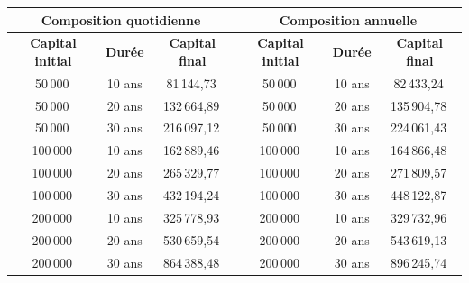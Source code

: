 \documentclass{article}
\begin{document}
\begin{enumerate}[label=\textbf{R2.\arabic*}]
                \begin{center}
                    \renewcommand{\arraystretch}{1.2}
                    \begin{tabular}{|c|c|c||c|c|c|}
                        \hline
                        \multicolumn{3}{|c||}{\textbf{Composition quotidienne}} & \multicolumn{3}{c|}{\textbf{Composition annuelle}} \\
                        \hline
                        \textbf{Capital initial} & \textbf{Durée} & \textbf{Capital final} & \textbf{Capital initial} & \textbf{Durée} & \textbf{Capital final} \\
                        \hline
                        50\,000\,\text{€} & 10 ans & 81\,144,73\,\text{€} & 
                        50\,000\,\text{€} & 10 ans & 82\,433,24\,\text{€} \\
                        \hline
                        50\,000\,\text{€} & 20 ans & 132\,664,89\,\text{€} & 
                        50\,000\,\text{€} & 20 ans & 135\,904,78\,\text{€} \\
                        \hline
                        50\,000\,\text{€} & 30 ans & 216\,097,12\,\text{€} & 
                        50\,000\,\text{€} & 30 ans & 224\,061,43\,\text{€} \\
                        \hline
                        100\,000\,\text{€} & 10 ans & 162\,889,46\,\text{€} & 
                        100\,000\,\text{€} & 10 ans & 164\,866,48\,\text{€} \\
                        \hline
                        100\,000\,\text{€} & 20 ans & 265\,329,77\,\text{€} & 
                        100\,000\,\text{€} & 20 ans & 271\,809,57\,\text{€} \\
                        \hline
                        100\,000\,\text{€} & 30 ans & 432\,194,24\,\text{€} & 
                        100\,000\,\text{€} & 30 ans & 448\,122,87\,\text{€} \\
                        \hline
                        200\,000\,\text{€} & 10 ans & 325\,778,93\,\text{€} & 
                        200\,000\,\text{€} & 10 ans & 329\,732,96\,\text{€} \\
                        \hline
                        200\,000\,\text{€} & 20 ans & 530\,659,54\,\text{€} & 
                        200\,000\,\text{€} & 20 ans & 543\,619,13\,\text{€} \\
                        \hline
                        200\,000\,\text{€} & 30 ans & 864\,388,48\,\text{€} & 
                        200\,000\,\text{€} & 30 ans & 896\,245,74\,\text{€} \\
                        \hline
                    \end{tabular}
                    \renewcommand{\arraystretch}{1}
                \end{center}
                
            \end{enumerate}

                
\end{document}
